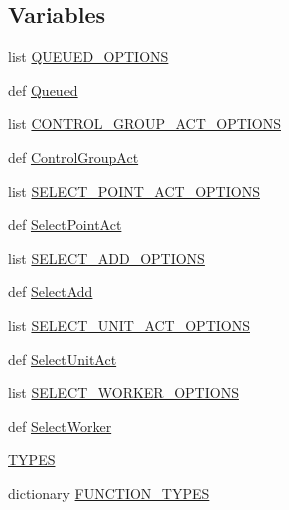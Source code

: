 \subsection*{Variables}
\begin{DoxyCompactItemize}
\item 
list \mbox{\hyperlink{namespacepysc2_1_1lib_1_1actions_a4919350aba12f97d18460d6b159be480}{Q\+U\+E\+U\+E\+D\+\_\+\+O\+P\+T\+I\+O\+NS}}
\item 
def \mbox{\hyperlink{namespacepysc2_1_1lib_1_1actions_afb9a99a2cdd59a23a647d2951093cca5}{Queued}}
\item 
list \mbox{\hyperlink{namespacepysc2_1_1lib_1_1actions_a17f4a8aacbf1bdc057d3650dd38b0ce9}{C\+O\+N\+T\+R\+O\+L\+\_\+\+G\+R\+O\+U\+P\+\_\+\+A\+C\+T\+\_\+\+O\+P\+T\+I\+O\+NS}}
\item 
def \mbox{\hyperlink{namespacepysc2_1_1lib_1_1actions_a135bd6ff599a408124ac73638dbf7705}{Control\+Group\+Act}}
\item 
list \mbox{\hyperlink{namespacepysc2_1_1lib_1_1actions_a5958e998483a63351edc01bc714a9c6c}{S\+E\+L\+E\+C\+T\+\_\+\+P\+O\+I\+N\+T\+\_\+\+A\+C\+T\+\_\+\+O\+P\+T\+I\+O\+NS}}
\item 
def \mbox{\hyperlink{namespacepysc2_1_1lib_1_1actions_ae29abc92bb08d061b049a01106cb855c}{Select\+Point\+Act}}
\item 
list \mbox{\hyperlink{namespacepysc2_1_1lib_1_1actions_aa11b8e374f2e39dcf0561b70735d9dd6}{S\+E\+L\+E\+C\+T\+\_\+\+A\+D\+D\+\_\+\+O\+P\+T\+I\+O\+NS}}
\item 
def \mbox{\hyperlink{namespacepysc2_1_1lib_1_1actions_a9a5eb3a062eade5b7b4aebd9469874d8}{Select\+Add}}
\item 
list \mbox{\hyperlink{namespacepysc2_1_1lib_1_1actions_a2ca5baeefd2b48c36e1153ddc70589bf}{S\+E\+L\+E\+C\+T\+\_\+\+U\+N\+I\+T\+\_\+\+A\+C\+T\+\_\+\+O\+P\+T\+I\+O\+NS}}
\item 
def \mbox{\hyperlink{namespacepysc2_1_1lib_1_1actions_a462c6eeb45f37a62f45b91117847af45}{Select\+Unit\+Act}}
\item 
list \mbox{\hyperlink{namespacepysc2_1_1lib_1_1actions_a8e81cb4be4879386dbbbd3f9d1cb3e04}{S\+E\+L\+E\+C\+T\+\_\+\+W\+O\+R\+K\+E\+R\+\_\+\+O\+P\+T\+I\+O\+NS}}
\item 
def \mbox{\hyperlink{namespacepysc2_1_1lib_1_1actions_a441d65909977d8b5c6cb4175239ad544}{Select\+Worker}}
\item 
\mbox{\hyperlink{namespacepysc2_1_1lib_1_1actions_aa7b257e76395d51bdbd857f48f82e9f9}{T\+Y\+P\+ES}}
\item 
dictionary \mbox{\hyperlink{namespacepysc2_1_1lib_1_1actions_a1e7e50490516cc04dd79662a590e9795}{F\+U\+N\+C\+T\+I\+O\+N\+\_\+\+T\+Y\+P\+ES}}

\end{DoxyCompactItemize}
